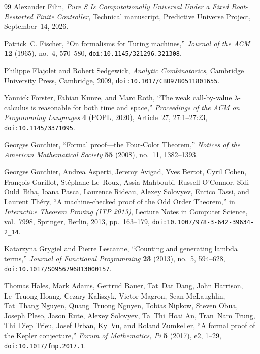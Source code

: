\documentclass[11pt,reqno]{amsart}
\numberwithin{equation}{section}
\theoremstyle{plain}
\theoremstyle{definition}
\theoremstyle{remark}
\begin{document}
\begin{thebibliography}{99}
Alexander Filin,
\emph{Pure S Is Computationally Universal Under a Fixed Root-Restarted Finite Controller},
Technical manuscript, Predictive Universe Project, September~14, 2026.

Patrick~C. Fischer,
``On formalisms for Turing machines,''
\emph{Journal of the ACM} \textbf{12} (1965), no.~4, 570--580,
\texttt{doi:10.1145/321296.321308}.

Philippe Flajolet and Robert Sedgewick,
\emph{Analytic Combinatorics},
Cambridge University Press, Cambridge, 2009,
\texttt{doi:10.1017/CBO9780511801655}.

Yannick Forster, Fabian Kunze, and Marc Roth,
``The weak call-by-value $\lambda$-calculus is reasonable for both time and space,''
\emph{Proceedings of the ACM on Programming Languages} \textbf{4} (POPL, 2020), Article~27, 27:1--27:23,
\texttt{doi:10.1145/3371095}.

Georges Gonthier,
``Formal proof---the Four-Color Theorem,''
\emph{Notices of the American Mathematical Society} \textbf{55} (2008), no.~11, 1382--1393.

Georges Gonthier, Andrea Asperti, Jeremy Avigad, Yves Bertot, Cyril Cohen, Fran{\c{c}}ois Garillot, St{\'e}phane Le~Roux, Assia Mahboubi, Russell O'Connor, Sidi Ould~Biha, Ioana Pasca, Laurence Rideau, Alexey Solovyev, Enrico Tassi, and Laurent Th{\'e}ry,
``A machine-checked proof of the Odd Order Theorem,''
in \emph{Interactive Theorem Proving (ITP 2013)},
Lecture Notes in Computer Science, vol.~7998, Springer, Berlin, 2013, pp.~163--179,
\texttt{doi:10.1007/978-3-642-39634-2\_14}.

Katarzyna Grygiel and Pierre Lescanne,
``Counting and generating lambda terms,''
\emph{Journal of Functional Programming} \textbf{23} (2013), no.~5, 594--628,
\texttt{doi:10.1017/S0956796813000157}.

Thomas Hales, Mark Adams, Gertrud Bauer, Tat~Dat Dang, John Harrison, Le~Truong Hoang, Cezary Kaliszyk, Victor Magron, Sean McLaughlin, Tat~Thang Nguyen, Quang~Truong Nguyen, Tobias Nipkow, Steven Obua, Joseph Pleso, Jason Rute, Alexey Solovyev, Ta~Thi~Hoai An, Tran~Nam Trung, Thi~Diep Trieu, Josef Urban, Ky~Vu, and Roland Zumkeller,
``A formal proof of the Kepler conjecture,''
\emph{Forum of Mathematics, Pi} \textbf{5} (2017), e2, 1--29,
\texttt{doi:10.1017/fmp.2017.1}.


\end{thebibliography}
\end{document}

